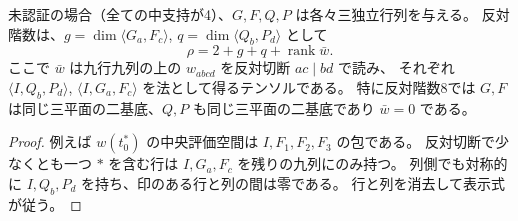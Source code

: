 \begin{corollary}\label{cor:point-commutator-rank}
未認証の場合（全ての中支持が4）、$G,F,Q,P$ は各々三独立行列を与える。
反対階数は、$g=\dim\langle G_a,F_c\rangle$, $q=\dim\langle Q_b,P_d\rangle$ として
\[
 \rho=2+g+q+\operatorname{rank}\bar w .
\]
ここで $\bar w$ は九行九列の上の $w_{abcd}$ を反対切断 $ac\mid bd$ で読み、
それぞれ $\langle I,Q_b,P_d\rangle$, $\langle I,G_a,F_c\rangle$ を法として得るテンソルである。
特に反対階数8では $G,F$ は同じ三平面の二基底、$Q,P$ も同じ三平面の二基底であり $\bar w=0$ である。
\end{corollary}
\begin{proof}
例えば $w(t_0^*)$ の中央評価空間は $I,F_1,F_2,F_3$ の包である。
反対切断で少なくとも一つ $*$ を含む行は $I,G_a,F_c$ を残りの九列にのみ持つ。
列側でも対称的に $I,Q_b,P_d$ を持ち、印のある行と列の間は零である。
行と列を消去して表示式が従う。
\end{proof}

